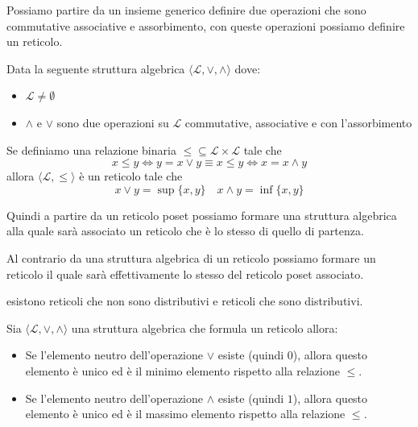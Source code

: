 Possiamo partire da un insieme generico definire due operazioni che sono commutative associative 
e assorbimento, con queste operazioni possiamo definire un reticolo.

\begin{teorema}
    Data la seguente struttura algebrica $\langle \mathcal{L}, \lor, \land\rangle$
    dove:
    \begin{itemize}
        \item $\mathcal{L}\ne \emptyset$
        \item $\land$ e $\lor$ sono due operazioni su $\mathcal{L}$ commutative, 
        associative e con l'assorbimento
    \end{itemize}
    Se definiamo una relazione binaria $\le\subseteq \mathcal{L}\times \mathcal{L}$
    tale che 
    $$x\le y \iff y=x\lor y \equiv x\le y \iff x= x\land y$$
    allora $\langle \mathcal{L},\le\rangle$ è un reticolo tale che 
    $$x\lor y = \sup \{x,y\} \quad x\land y = \inf \{x,y\}$$
\end{teorema}

Quindi a partire da un reticolo poset possiamo formare una struttura algebrica alla quale 
sarà associato un reticolo che è lo stesso di quello di partenza. 

Al contrario da una struttura algebrica di un reticolo possiamo formare un reticolo 
il quale sarà effettivamente lo stesso del reticolo poset associato.

esistono reticoli che non sono distributivi e reticoli che sono distributivi.

\begin{nota}
    Sia $\langle \mathcal{L}, \lor, \land\rangle$ una struttura algebrica che formula 
    un reticolo allora:
    \begin{itemize}
        \item Se l'elemento neutro dell'operazione $\lor$ esiste (quindi $0$), allora 
        questo elemento è unico ed è il minimo elemento rispetto alla relazione $\le$.
        \item Se l'elemento neutro dell'operazione $\land$ esiste (quindi $1$), allora 
        questo elemento è unico ed è il massimo elemento rispetto alla relazione $\le$.
    \end{itemize}
\end{nota}

